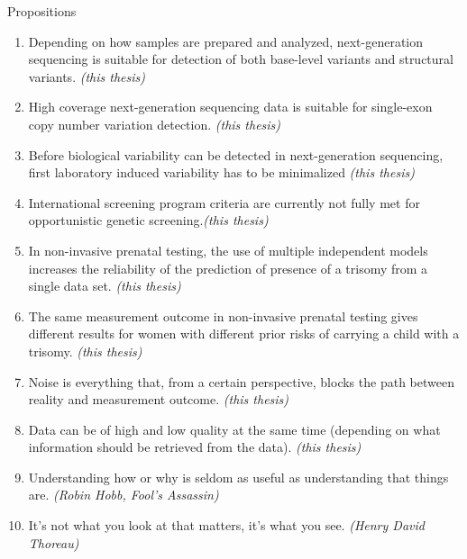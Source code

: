 \clearpage
\null\newpage

\noindent
	\Large
Propositions

\small

\begin{enumerate}
	
	\item Depending on how samples are prepared and analyzed, next-generation sequencing is suitable for detection of both base-level variants and structural variants. \textsl{(this thesis)}
	
	\item High coverage next-generation sequencing data is suitable for single-exon copy number variation detection. \textsl{(this thesis)}
	
	\item Before biological variability can be detected in next-generation sequencing, first laboratory induced variability has to be minimalized \textsl{(this thesis)}
	
	\item International screening program criteria  are currently not fully met for opportunistic genetic screening.\textsl{(this thesis)}
	
	\item In non-invasive prenatal testing, the use of multiple independent models increases the reliability of  the prediction of presence of a trisomy from a single data set. \textsl{(this thesis)}
	
	\item The same measurement outcome in non-invasive prenatal testing gives different results for women with different prior risks of carrying a child with a trisomy. \textsl{(this thesis)}
	
	\item Noise is everything that, from a certain perspective, blocks the path between reality and measurement outcome. \textsl{(this thesis)}
	
	\item Data can be of high and low quality at the same time (depending on what information should be retrieved from the data). \textsl{(this thesis)}
	
	\item Understanding how or why is seldom as useful as understanding that things are. \textsl{(Robin Hobb, Fool's Assassin)}
	
	\item It’s not what you look at that matters, it’s what you see. \textsl{(Henry David Thoreau)}
	
\end{enumerate}

\null\newpage
\null\newpage